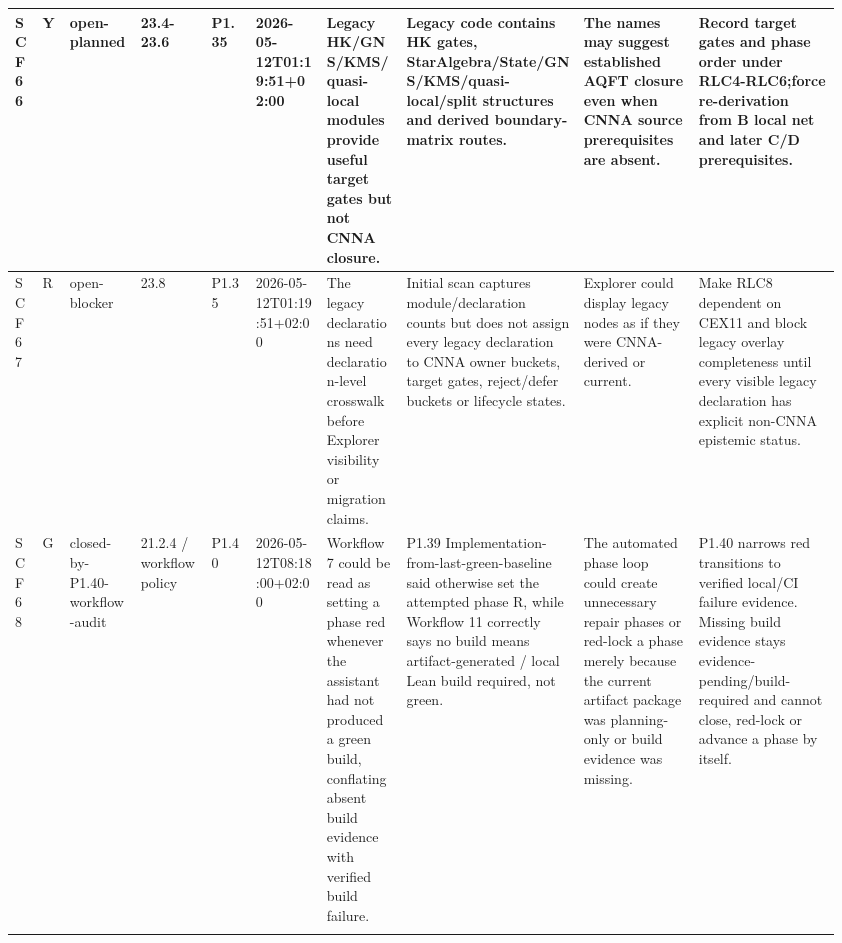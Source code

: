 \begin{longtable}{L{0.03\linewidth} L{0.026\linewidth} L{0.087\linewidth} L{0.085\linewidth} L{0.052\linewidth} L{0.085\linewidth} L{0.095\linewidth} L{0.205\linewidth} L{0.13\linewidth} L{0.165\linewidth}}
\hline
\addlinespace[0.24em]
SCF66 & Y & open-planned & 23.4-23.6 & P1.35 & 2026-05-12T01:19:51+02:00 & Legacy HK/\allowbreak{}GNS/\allowbreak{}KMS/\allowbreak{}quasi-local modules provide useful target gates but not CNNA closure. & Legacy code contains HK gates, StarAlgebra/\allowbreak{}State/\allowbreak{}GNS/\allowbreak{}KMS/\allowbreak{}quasi-local/\allowbreak{}split structures and derived boundary-matrix routes. & The names may suggest established AQFT closure even when CNNA source prerequisites are absent. & Record target gates and phase order under RLC4-RLC6;\newline force re-derivation from B local net and later C/\allowbreak{}D prerequisites.\\
\hline
\addlinespace[0.24em]
SCF67 & R & open-blocker & 23.8 & P1.35 & 2026-05-12T01:19:51+02:00 & The legacy declarations need declaration-level crosswalk before Explorer visibility or migration claims. & Initial scan captures module/\allowbreak{}declaration counts but does not assign every legacy declaration to CNNA owner buckets, target gates, reject/\allowbreak{}defer buckets or lifecycle states. & Explorer could display legacy nodes as if they were CNNA-derived or current. & Make RLC8 dependent on CEX11 and block legacy overlay completeness until every visible legacy declaration has explicit non-CNNA epistemic status.\\
\hline
\addlinespace[0.24em]
SCF68 & G & closed-by-P1.40-workflow-audit & 21.2.4 /\allowbreak{} workflow policy & P1.40 & 2026-05-12T08:18:00+02:00 & Workflow 7 could be read as setting a phase red whenever the assistant had not produced a green build, conflating absent build evidence with verified build failure. & P1.39 Implementation-from-last-green-baseline said otherwise set the attempted phase R, while Workflow 11 correctly says no build means artifact-generated /\allowbreak{} local Lean build required, not green. & The automated phase loop could create unnecessary repair phases or red-lock a phase merely because the current artifact package was planning-only or build evidence was missing. & P1.40 narrows red transitions to verified local/\allowbreak{}CI failure evidence. Missing build evidence stays evidence-pending/\allowbreak{}build-required and cannot close, red-lock or advance a phase by itself.\\
\hline
\addlinespace[0.24em]

\end{longtable}
